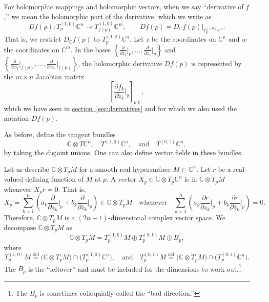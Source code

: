 \documentclass[12pt,openany]{book}
\newcommand{\C}{{\mathbb{C}}}
\theoremstyle{plain}
\theoremstyle{remark}
\theoremstyle{definition}
\theoremstyle{exercise}
\theoremstyle{example}
\newcommand{\sectionref}[1]{\hyperref[#1]{section~\ref*{#1}}}
\begin{document}
For holomorphic mappings and holomorphic vectors,
when we say ``derivative of $f$,'' we mean the holomorphic part of the
derivative, which we write as
%
\begin{equation*}
D f(p) \colon T_p^{(1,0)} \C^n \to T_{f(p)}^{(1,0)} \C^m ,
\qquad
D f(p) = D_{\C} f(p) \big|_{T_p^{(1,0)} \C^n} .
\end{equation*}
That is, we restrict $D_\C f(p)$ to $T_p^{(1,0)} \C^n$.
Let $z$ be the coordinates on $\C^n$ and
$w$ the coordinates on $\C^m$.
In the bases
$\left\{ \frac{\partial}{\partial z_1} \big|_p,\ldots,
\frac{\partial}{\partial z_n} \big|_p \right\}$
and
$\left\{ \frac{\partial}{\partial w_1} \big|_{f(p)},\ldots,
\frac{\partial}{\partial w_m} \big|_{f(p)} \right\}$,
the holomorphic derivative $Df(p)$
is represented by the $m \times n$ Jacobian matrix
\begin{equation*}
\left[
\frac{\partial f_k}{\partial z_\ell} \Big|_p
\right]_{k\ell} ,
\end{equation*}
which we have seen in \sectionref{sec:derivatives}
and for which we also used the notation $Df(p)$.

As before, define the tangent bundles
\begin{equation*}
\C \otimes T\C^n,
\quad
T^{(1,0)} \C^n,
\quad \text{and} \quad
T^{(0,1)} \C^n ,
\end{equation*}
by taking the disjoint unions.
One can also define vector fields in these bundles.

Let us describe $\C \otimes T_pM$
for a smooth real hypersurface $M \subset \C^n$.
Let $r$ be a real-valued defining function of
$M$ at $p$.  A vector
$X_p \in \C \otimes T_p\C^n$ is in
$\C \otimes T_pM$ whenever $X_p r = 0$.  That is,
\begin{equation*}
X_p = \sum_{k=1}^n
\left(
a_k
\frac{\partial}{\partial z_k} \Big|_p
+
b_k
\frac{\partial}{\partial \bar{z}_k} \Big|_p
\right) \in \C \otimes T_p M
\quad
\text{whenever}
\quad
 \sum_{k=1}^n
\left(
a_k
\frac{\partial r}{\partial z_k} \Big|_p
+
b_k
\frac{\partial r}{\partial \bar{z}_k} \Big|_p
\right)
= 0 .
\end{equation*}
Therefore, $\C \otimes T_p M$ is a $(2n-1)$-dimensional complex vector space.
We decompose $\C \otimes T_p M$ as
\begin{equation*}
\C \otimes T_pM =
T_p^{(1,0)} M \oplus T_p^{(0,1)} M \oplus B_p ,
\end{equation*}
where
\begin{equation*}
T_p^{(1,0)} M \overset{\text{def}}{=} \bigl( \C \otimes T_pM \bigr) \cap
\bigl( T_p^{(1,0)} \C^n \bigr),  \quad \text{and}
\quad
T_p^{(0,1)} M \overset{\text{def}}{=} \bigl( \C \otimes T_pM \bigr) \cap
\bigl( T_p^{(0,1)} \C^n \bigr) .
\end{equation*}
The $B_p$ is the ``leftover'' and must
be included for the dimensions to work out.\footnote{%
The $B_p$ is sometimes colloquially called the ``bad direction.''}
\end{document}
